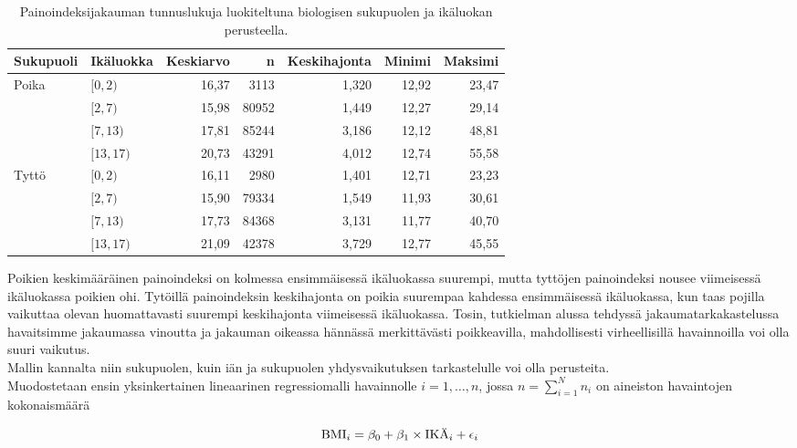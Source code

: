 \documentclass[finnish]{docopts}
\begin{document}
\begin{table}[H]
\centering
\begin{tabular}{llrrrrr}
\toprule
Sukupuoli & Ikäluokka & Keskiarvo & n & Keskihajonta & Minimi & Maksimi\\
\midrule
Poika & $[0,2)$ & 16,37 & 3113 & 1,320 & 12,92 & 23,47\\
 & $[2,7)$ & 15,98 & 80952 & 1,449 & 12,27 & 29,14\\
 & $[7,13)$ & 17,81 & 85244 & 3,186 & 12,12 & 48,81\\
 & $[13,17)$ & 20,73 & 43291 & 4,012 & 12,74 & 55,58\\
\addlinespace
Tyttö & $[0,2)$ & 16,11 & 2980 & 1,401 & 12,71 & 23,23\\
 & $[2,7)$ & 15,90 & 79334 & 1,549 & 11,93 & 30,61\\
 & $[7,13)$ & 17,73 & 84368 & 3,131 & 11,77 & 40,70\\
 & $[13,17)$ & 21,09 & 42378 & 3,729 & 12,77 & 45,55\\
\bottomrule
\end{tabular}
\caption{Painoindeksijakauman tunnuslukuja luokiteltuna biologisen sukupuolen ja ikäluokan perusteella.}
\label{table:deskrtaulu}
\end{table}

Poikien keskimääräinen painoindeksi on kolmessa ensimmäisessä ikäluokassa suurempi, mutta tyttöjen painoindeksi nousee viimeisessä ikäluokassa poikien ohi. Tytöillä painoindeksin keskihajonta on poikia suurempaa kahdessa ensimmäisessä ikäluokassa, kun taas pojilla vaikuttaa olevan huomattavasti suurempi keskihajonta viimeisessä ikäluokassa. Tosin, tutkielman alussa tehdyssä jakaumatarkakastelussa havaitsimme jakaumassa vinoutta ja jakauman oikeassa hännässä merkittävästi poikkeavilla, mahdollisesti virheellisillä havainnoilla voi olla suuri vaikutus.\\

Mallin kannalta niin sukupuolen, kuin iän ja sukupuolen yhdysvaikutuksen tarkastelulle voi olla perusteita.\\

Muodostetaan ensin yksinkertainen lineaarinen regressiomalli havainnolle $i = 1,\dots, n$, jossa $n = \sum\limits_{i = 1}^{N} n_{i}$ on aineiston havaintojen kokonaismäärä


\begin{equation}
\text{BMI}_i = \beta_0 + \beta_1 \times \text{IKÄ}_i + \epsilon_i \label{eq:lm1}\\
\end{equation}
\end{document}
